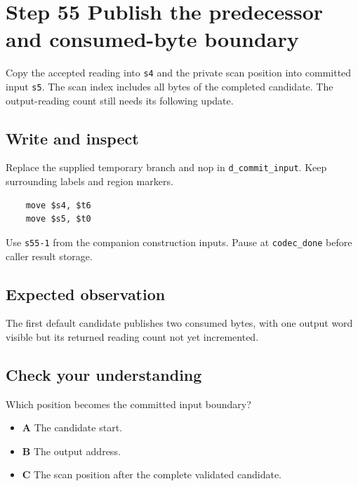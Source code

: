 \section{Step 55 Publish the predecessor and consumed-byte boundary}\label{delta-s55}

Copy the accepted reading into \texttt{s4} and the private scan position into committed input \texttt{s5}. The scan index includes all bytes of the completed candidate. The output-reading count still needs its following update.

\subsection{Write and inspect}
Replace the supplied temporary branch and nop in \texttt{d\_commit\_input}. Keep surrounding labels and region markers.

\begin{verbatim}
    move $s4, $t6
    move $s5, $t0
\end{verbatim}
Use \texttt{s55-1} from the companion construction inputs. Pause at \texttt{codec\_done} before caller result storage.

\subsection{Expected observation}
The first default candidate publishes two consumed bytes, with one output word visible but its returned reading count not yet incremented.

\subsection{Check your understanding}
Which position becomes the committed input boundary?

\begin{itemize}
  \item \textbf{A} The candidate start.
  \item \textbf{B} The output address.
  \item \textbf{C} The scan position after the complete validated candidate.
\end{itemize}
